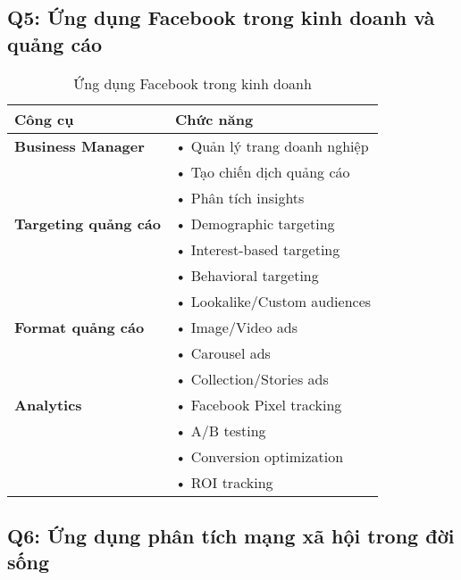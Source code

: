 \documentclass{article}
\begin{document}
\subsection*{Q5: Ứng dụng Facebook trong kinh doanh và quảng cáo}

\begin{table}[h!]
\begin{tabularx}{\textwidth}{|X|X|}
\hline
\textbf{Công cụ} & \textbf{Chức năng} \\
\hline
\textbf{Business Manager} & • Quản lý trang doanh nghiệp \\
& • Tạo chiến dịch quảng cáo \\
& • Phân tích insights \\
\hline
\textbf{Targeting quảng cáo} & • Demographic targeting \\
& • Interest-based targeting \\
& • Behavioral targeting \\
& • Lookalike/Custom audiences \\
\hline
\textbf{Format quảng cáo} & • Image/Video ads \\
& • Carousel ads \\
& • Collection/Stories ads \\
\hline
\textbf{Analytics} & • Facebook Pixel tracking \\
& • A/B testing \\
& • Conversion optimization \\
& • ROI tracking \\
\hline
\end{tabularx}
\caption{Ứng dụng Facebook trong kinh doanh}
\end{table}

\subsection*{Q6: Ứng dụng phân tích mạng xã hội trong đời sống}
\end{document}
